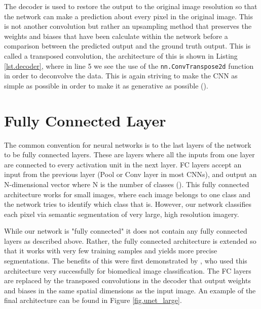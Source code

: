 


The decoder is used to restore the output to the original image resolution so that the network can make a prediction about every pixel in the original image. This is not another convolution but rather an upsampling method that preserves the weights and biases that have been calculate within the network before a comparison between the predicted output and the ground truth output. This is called a transposed convolution, the architecture of this is shown in Listing \ref{lst.decoder}, where in line 5 we see the use of the \texttt{nn.ConvTranspose2d} function in order to deconvolve the data. This is again striving to make the CNN as simple as possible in order to make it as generative as possible (\cite{Springenberg14}).

\section{Fully Connected Layer}
The common convention for neural networks is to the last layers of the network to be fully connected layers. These are layers where all the inputs from one layer are connected to every activation unit in the next layer. FC layers accept an input from the previous layer (Pool or Conv layer in most CNNs), and output an N-dimensional vector where N is the number of classes (\cite{simard03}). This fully connected architecture works for small images, where each image belongs to one class and the network tries to identify which class that is. However, our network classifies each pixel via semantic segmentation of very large, high resolution imagery.
\par
While our network is "fully connected" it does not contain any fully connected layers as described above. Rather, the fully connected architecture is extended so that it works with very few training samples and yields more precise segmentations. The benefits of this were first demonstrated by \citet{ronneberger15}, who used this architecture very successfully for biomedical image classification.  The FC layers are replaced by the transposed convolutions in the decoder that output weights and biases in the same spatial dimensions as the input image. An example of the final architecture can be found in \citet{Richmond19a} Figure \ref{fig.unet_large}.

